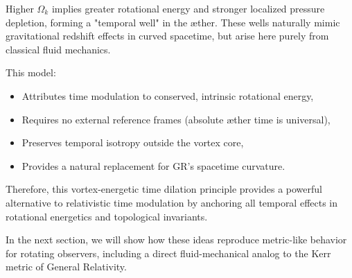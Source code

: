 Higher $\Omega_k$ implies greater rotational energy and stronger localized pressure depletion, forming a "temporal well" in the æther. These wells naturally mimic gravitational redshift effects in curved spacetime, but arise here purely from classical fluid mechanics.

This model:

\begin{itemize}
\item Attributes time modulation to conserved, intrinsic rotational energy,
\item Requires no external reference frames (absolute æther time is universal),
\item Preserves temporal isotropy outside the vortex core,
\item Provides a natural replacement for GR's spacetime curvature.
\end{itemize}

Therefore, this vortex-energetic time dilation principle provides a powerful alternative to relativistic time modulation by anchoring all temporal effects in rotational energetics and topological invariants.

In the next section, we will show how these ideas reproduce metric-like behavior for rotating observers, including a direct fluid-mechanical analog to the Kerr metric of General Relativity.